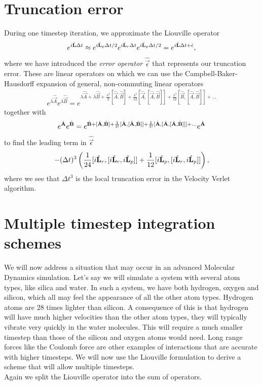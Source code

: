 \section{Truncation error}
\label{sec:velocity_verlet_error}
During one timestep iteration, we approximate the Liouville operator
\begin{align}
	e^{i\hat{\mathbf L} \Delta t} \approx e^{i\hat{\mathbf L}_p \Delta t/2}e^{i\hat{\mathbf L}_r \Delta t}e^{i\hat{\mathbf L}_p \Delta t/2} = e^{i\hat{\mathbf L} \Delta t + \hat{\mathbf \epsilon}},
\end{align}
where we have introduced the \textit{error operator} $\hat{\vec \epsilon}$ that represents our truncation error. These are linear operators on which we can use the Campbell-Baker-Hausdorff expansion of general, non-commuting linear operators
\begin{align}
	e^{\lambda\hat{\vec A}}e^{\lambda\hat{\vec B}} = e^{\lambda\hat{\vec A} + \lambda\hat{\vec B} + \frac{\lambda^2}{2}[\hat{\vec A},\hat{\vec B}] + \frac{\lambda^3}{12}[\hat{\vec A},[\hat{\vec A},\hat{\vec B}]] + \frac{\lambda^3}{12}[\hat{\vec B},[\hat{\vec A},\hat{\vec B}]] + ...}
\end{align}
together with 
\begin{align}
	e^{\hat{\mathbf{A}}}e^{\hat{\mathbf{B}}} = e^{\hat{\mathbf{B}} + [\hat{\mathbf{A}},\hat{\mathbf{B}}] + \frac{1}{2!}[\hat{\mathbf{A}},[\hat{\mathbf{A}},\hat{\mathbf{B}}]] + \frac{1}{3!}[\hat{\mathbf{A}},[\hat{\mathbf{A}},[\hat{\mathbf{A}},\hat{\mathbf{B}}]]] + ...}e^{\hat{\mathbf{A}}}
\end{align}
to find the leading term in $\hat{\vec \epsilon}$
\begin{align}
	-(\Delta t)^3\left(\frac{1}{24}[i\hat{\mathbf L}_r, [i\hat{\mathbf L}_r, i\hat{\mathbf L}_p]] + \frac{1}{12}[i\hat{\mathbf L}_p, [i\hat{\mathbf L}_r, i\hat{\mathbf L}_p]]\right),
\end{align}
where we see that $\Delta t^3$ is the local truncation error in the Velocity Verlet algorithm. 
\section{Multiple timestep integration schemes}
\label{sec:multiple_timestep_schemes}
We will now address a situation that may occur in an advanced Molecular Dynamics simulation. Let's say we will simulate a system with several atom types, like silica and water. In such a system, we have both hydrogen, oxygen and silicon, which all may feel the appearance of all the other atom types. Hydrogen atoms are 28 times lighter than silicon. A consequence of this is that hydrogen will have much higher velocities than the other atom types, they will typically vibrate very quickly in the water molecules. This will require a much smaller timestep than those of the silicon and oxygen atoms would need. Long range forces like the Coulomb force are other examples of interactions that are accurate with higher timesteps. We will now use the Liouville formulation to derive a scheme that will allow multiple timesteps.\\
Again we split the Liouville operator into the sum of operators. 